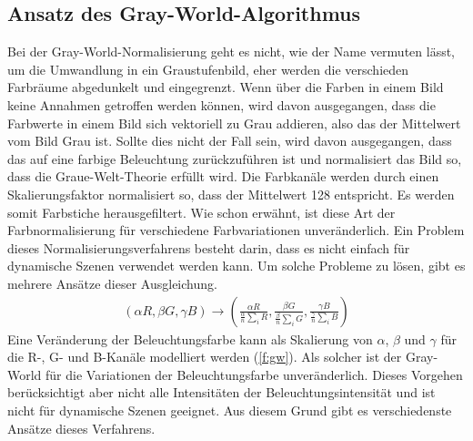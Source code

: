   \subsection{Ansatz des Gray-World-Algorithmus}\label{s.gw}
Bei der Gray-World-Normalisierung \cite{buenaposada2001variations} geht es nicht, wie der Name vermuten lässt, um die Umwandlung in ein Graustufenbild, eher werden die verschieden Farbräume abgedunkelt und eingegrenzt. Wenn über die Farben in einem Bild keine Annahmen getroffen werden können, wird davon ausgegangen, dass die Farbwerte in einem Bild sich vektoriell zu Grau addieren, also das der Mittelwert vom Bild Grau ist. Sollte dies nicht der Fall sein, wird davon ausgegangen, dass das auf eine farbige Beleuchtung zurückzuführen ist und normalisiert das Bild so, dass die Graue-Welt-Theorie erfüllt wird. Die Farbkanäle werden durch einen Skalierungsfaktor normalisiert so, dass der Mittelwert 128 entspricht. Es werden somit Farbstiche herausgefiltert. Wie schon erwähnt, ist diese Art der Farbnormalisierung für verschiedene Farbvariationen unveränderlich. Ein Problem dieses Normalisierungsverfahrens besteht darin, dass es nicht einfach für dynamische Szenen verwendet werden kann. Um solche Probleme zu lösen, gibt es mehrere Ansätze dieser Ausgleichung.
\begin{align} \label{f:gw} (\alpha R, \beta G, \gamma B) \rightarrow\left(\frac{\alpha R} {\frac{\alpha}{n} \sum_{i} R}, \frac{\beta G} {\frac{\beta}{n} \sum_{i} G}, \frac{\gamma B} {\frac{\gamma}{n} \sum_{i} B} \right) \end{align}
Eine Veränderung der Beleuchtungsfarbe kann als Skalierung von $\alpha$, $\beta$ und $\gamma$ für die R-, G- und B-Kanäle modelliert werden (\ref{f:gw}). Als solcher ist der Gray-World für die Variationen der Beleuchtungsfarbe unveränderlich. Dieses Vorgehen berücksichtigt aber nicht alle Intensitäten der Beleuchtungsintensität und ist nicht für dynamische Szenen geeignet. Aus diesem Grund gibt es verschiedenste Ansätze dieses Verfahrens.
